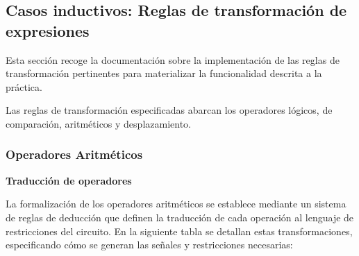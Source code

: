 \documentclass[a4paper,12pt]{report}
\begin{document}
	
	\subsection{Casos inductivos: Reglas de transformación de expresiones}
	
	\noindent Esta sección recoge la documentación sobre la implementación de las reglas de transformación pertinentes para materializar la funcionalidad descrita a la práctica.
	
	\vspace{0.2cm}
	\noindent Las reglas de transformación especificadas abarcan los operadores lógicos, de comparación, aritméticos y desplazamiento.
	
	
	
	\subsubsection{Operadores Aritméticos}
	
	
	\vspace{0.6cm}
	\noindent \textbf{Traducción de operadores}
	
	\vspace{0.4cm}
	\noindent La formalización de los operadores aritméticos se establece mediante un sistema de reglas de deducción que definen la traducción de cada operación al lenguaje de restricciones del circuito. En la siguiente tabla se detallan estas transformaciones, especificando cómo se generan las señales y restricciones necesarias:
	
\end{document}
